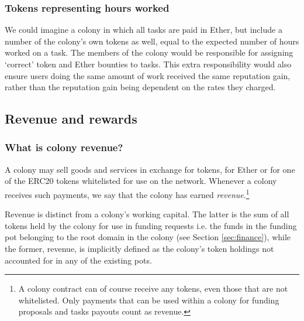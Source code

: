 \subsubsection*{Tokens representing hours worked}

We could imagine a colony in which all tasks are paid in Ether, but include a number of the colony's own tokens as well, equal to the expected number of hours worked on a task. The members of the colony would be responsible for assigning `correct' token and Ether bounties to tasks. This extra responsibility would also ensure users doing the same amount of work received the same reputation gain, rather than the reputation gain being dependent on the rates they charged.

%

\subsection{Revenue and rewards}\label{sec:revenue}

\subsubsection*{What is colony revenue?}

A colony may sell goods and services in exchange for tokens, for Ether or for one of the  ERC20 tokens whitelisted for use on the network. Whenever a colony receives such payments, we say that the colony has earned \emph{revenue}.\footnote{A colony contract can of course receive any tokens, even those that are not whitelisted. Only payments that can be used within a colony for funding proposals and tasks payouts count as revenue.}

Revenue is distinct from a colony's working capital. The latter is the sum of all tokens held by the colony for use in funding requests i.e. the funds in the funding pot belonging to the root domain in the colony (see Section \ref{sec:finance}), while the former, revenue, is implicitly defined as the colony's token holdings not accounted for in any of the existing pots.

